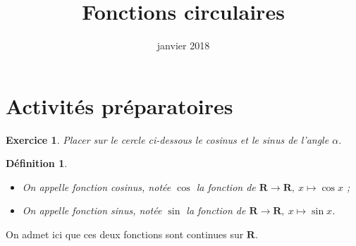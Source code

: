 \documentclass[11pt,a4paper,french]{article}
\title{Fonctions circulaires}
\author{\bsc{Jumel}}
\date{janvier 2018}
\makeatletter
\renewcommand{\maketitle}%
{\framebox{%
    \begin{minipage}{1.0\linewidth}%
      \begin{center}%
        \Large \@title ~-- \@author \\%
        \@date%
      \end{center}%
    \end{minipage}}%
  \normalsize%
}
\newcommand{\R}{\mathbf{R}}
\theoremstyle{break}
\newtheorem{definition}{Définition}
\theoremstyle{plain}
\newtheorem{exerciceT}{Exercice}
\theoremstyle{nonumberplain}
\theoremstyle{nonumberbreak}
\newenvironment{exercice}{\begin{framed}\begin{exerciceT}}{\end{exerciceT}\end{framed}}
\makeatother
\begin{document}
\noindent\maketitle

\bigskip

\section*{Activités préparatoires}

\begin{exercice}
  Placer sur le cercle ci-dessous le cosinus et le sinus de l'angle
  $\alpha$.

  \begin{center}
  \end{center}
\end{exercice}

\begin{definition}
  \begin{itemize}
    \item On appelle fonction cosinus, notée $\cos$ la fonction de $\R
      \to \R,\ x\mapsto \cos x$ ;
    \item On appelle fonction sinus, notée $\sin$ la fonction de $\R \to
      \R,\ x\mapsto \sin x$.
  \end{itemize}
\end{definition}

On admet ici que ces deux fonctions sont continues sur $\R$.
\end{document}
